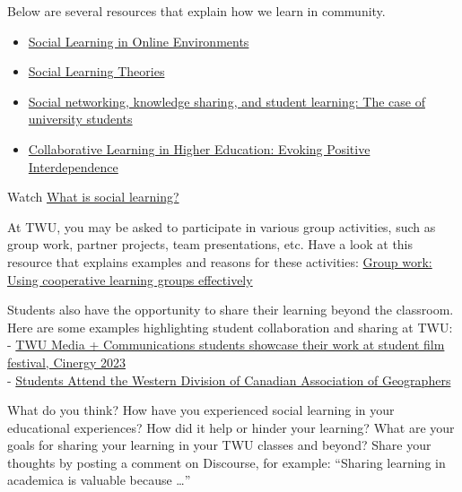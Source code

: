 \documentclass[
]{book}
\providecommand{\tightlist}{%
  \setlength{\itemsep}{0pt}\setlength{\parskip}{0pt}}
\theoremstyle{definition}
\theoremstyle{definition}
\theoremstyle{definition}
\theoremstyle{definition}
\theoremstyle{remark}
\begin{document}
\begin{reflect}
Below are several resources that explain how we learn in community.

\begin{itemize}
\tightlist
\item
  \href{https://openpress.usask.ca/humanmooc/chapter/social-learning-in-online-environments/}{Social Learning in Online Environments}
\item
  \href{https://socialsci.libretexts.org/Bookshelves/Education_and_Professional_Development/Teaching_Crowds_-_Learning_and_Social_Media_(Dron_and_Anderson)/02\%3A_Social_Learning_Theories}{Social Learning Theories}
\item
  \href{https://www.sciencedirect.com/science/article/abs/pii/S0360131516300872}{Social networking, knowledge sharing, and student learning: The case of university students}
\item
  \href{https://www.ncbi.nlm.nih.gov/pmc/articles/PMC5132366/}{Collaborative Learning in Higher Education: Evoking Positive Interdependence}
\end{itemize}

Watch \href{https://www.youtube.com/watch?v=AB-_822TRms}{What is social learning?}

At TWU, you may be asked to participate in various group activities, such as group work, partner projects, team presentations, etc. Have a look at this resource that explains examples and reasons for these activities: \href{https://cft.vanderbilt.edu/guides-sub-pages/setting-up-and-facilitating-group-work-using-cooperative-learning-groups-effectively/}{Group work: Using cooperative learning groups effectively}

Students also have the opportunity to share their learning beyond the classroom. Here are some examples highlighting student collaboration and sharing at TWU:\\
- \href{https://www.twu.ca/news-events/news/twu-media-communications-students-showcase-their-work-student-film-festival}{TWU Media + Communications students showcase their work at student film festival, Cinergy 2023}\\
- \href{https://www.twu.ca/research/student-research/news}{Students Attend the Western Division of Canadian Association of Geographers}

What do you think? How have you experienced social learning in your educational experiences? How did it help or hinder your learning? What are your goals for sharing your learning in your TWU classes and beyond? Share your thoughts by posting a comment on Discourse, for example: ``Sharing learning in academica is valuable because \ldots{}''
\end{reflect}
\end{document}

